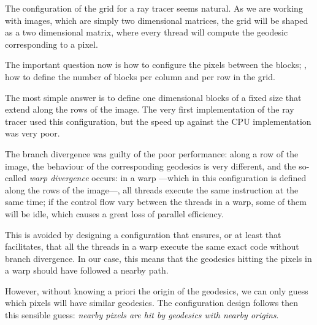 The configuration of the grid for a ray tracer seems natural. As we are working with images, which are simply two dimensional matrices, the grid will be shaped as a two dimensional matrix, where every thread will compute the geodesic corresponding to a pixel.

The important question now is how to configure the pixels between the blocks; \ie, how to define the number of blocks per column and per row in the grid.

The most simple answer is to define one dimensional blocks of a fixed size that extend along the rows of the image. The very first implementation of the ray tracer used this configuration, but the speed up against the \ac{CPU} implementation was very poor.

The branch divergence was guilty of the poor performance: along a row of the image, the behaviour of the corresponding geodesics is very different, and the so-called \emph{warp divergence} occurs: in a warp ---which in this configuration is defined along the rows of the image---, all threads execute the same instruction at the same time; if the control flow vary between the threads in a warp, some of them will be idle, which causes a great loss of parallel efficiency.

This is avoided by designing a configuration that ensures, or at least that facilitates, that all the threads in a warp execute the same exact code without branch divergence. In our case, this means that the geodesics hitting the pixels in a warp should have followed a nearby path.

However, without knowing a priori the origin of the geodesics, we can only guess which pixels will have similar geodesics. The configuration design follows then this sensible guess: \emph{nearby pixels are hit by geodesics with nearby origins}.

